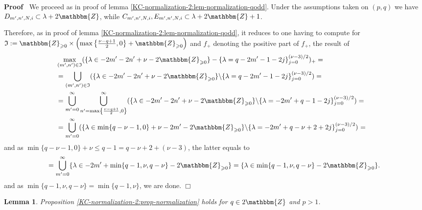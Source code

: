 \documentclass{article}
\newcommand{\assign}{:=}
\newenvironment{proof}{\noindent\textbf{Proof\ }}{\hspace*{\fill}$\Box$\medskip}
\numberwithin{definition}{section}
\newtheorem{lemma}{Lemma}
\numberwithin{lemma}{section}
\numberwithin{proposition}{section}
{\theorembodyfont{\rmfamily}\newtheorem{remark}{Remark}
\numberwithin{remark}{section}
}
\begin{document}
\begin{proof}
  We proceed as in proof of lemma
  \ref{KC-normalization-2:lem-normalization-qodd}. Under the assumptions taken
  on $( p, q)$ we have $D_{m', n', N, i} \subset \lambda + 2\mathbbm{Z}$,
  while $C_{m', n', N, i}, E_{m', n', N, i} \subset \lambda + 2\mathbbm{Z}+
  1$.
  
  Therefore, as in proof of lemma
  \ref{KC-normalization-2:lem-normalization-qodd}, it reduces to one having to
  compute for $\mathfrak{I} \assign \mathbbm{Z}_{\geqslant 0} \times \left(
  \max \left\{ \frac{\nu - q + 1}{2}, 0 \right\} +\mathbbm{Z}_{\geqslant 0}
  \right)$ and $f_+$ denoting the positive part of $f_+$, the result of
  \begin{eqnarray}
    & \max_{( m', n') \in \mathfrak{I}} ( \{ \lambda \in - 2 m' - 2 n' + \nu
    - 2\mathbbm{Z}_{\geqslant 0} \} - \{ \lambda = q - 2 m' - 1 - 2 j \}_{j =
    0}^{( \nu - 3) / 2})_+ = &  \nonumber\\
    & = \bigcup_{( m', n') \in \mathfrak{I}} ( \{ \lambda \in - 2 m' - 2 n' +
    \nu - 2\mathbbm{Z}_{\geqslant 0} \} \backslash \{ \lambda = q - 2 m' - 1 -
    2 j \}_{j = 0}^{( \nu - 3) / 2}) = &  \nonumber\\
    & = \bigcup_{m' = 0}^{\infty} \bigcup_{n' = \max \left\{ \frac{\nu - q +
    1}{2}, 0 \right\}}^{\infty} ( \{ \lambda \in - 2 m' - 2 n' + \nu -
    2\mathbbm{Z}_{\geqslant 0} \} \backslash \{ \lambda = - 2 m' + q - 1 - 2 j
    \}_{j = 0}^{( \nu - 3) / 2}) = &  \nonumber\\
    & = \bigcup_{m' = 0}^{\infty} ( \{ \lambda \in \min \{ q - \nu - 1, 0 \}
    + \nu - 2 m' - 2\mathbbm{Z}_{\geqslant 0} \} \backslash \{ \lambda = - 2
    m' + q - \nu + 2 + 2 j \}_{j = 0}^{( \nu - 3) / 2})^{} = &  \nonumber
  \end{eqnarray}
  and as $\min \{ q - \nu - 1, 0 \} + \nu \leqslant q - 1 = q - \nu + 2 + (
  \nu - 3)$, the latter equals to
  \[ = \bigcup_{m' = 0}^{\infty} \{ \lambda \in - 2 m' + \min \{ q - 1, \nu, q
     - \nu \} - 2\mathbbm{Z}_{\geqslant 0} \} = \{ \lambda \in \min \{ q - 1,
     \nu, q - \nu \} - 2\mathbbm{Z}_{\geqslant 0} \} . \]
  and as $\min \{ q - 1, \nu, q - \nu \} = \min \{ q - 1, \nu \}$, we are
  done.
\end{proof}

\begin{lemma}
  \label{KC-normalization-2:lem-normalization-q-even-p-odd}Proposition
  \ref{KC-normalization-2:prop-normalization} holds for $q \in 2\mathbbm{Z}$
  and $p > 1$.
\end{lemma}
\end{document}
